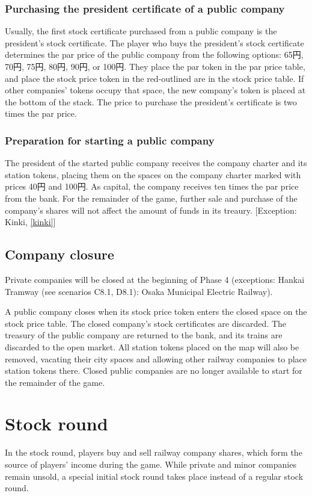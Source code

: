 \documentclass{article}
\begin{document}
\begin{CJK}{UTF8}{min}
\begin{multicols}{2}
\subsubsection{Purchasing the president certificate of a public company}
\label{floating-par-price}
Usually, the first stock certificate purchased from a public company
is the president's stock certificate. The player who buys the
president's stock certificate determines the par price of the public
company from the following options: 65円, 70円, 75円, 80円, 90円, or
100円. They place the par token in the par price table, and place
the stock price token in the red-outlined are in the stock price
table. If other companies' tokens occupy that space, the new company's
token is placed at the bottom of the stack. The price to purchase the
president's certificate is two times the par price.

\subsubsection{Preparation for starting a public company}
\label{floating-initial-capital}
The president of the started public company receives the company
charter and its station tokens, placing them on the spaces on the
company charter marked with prices 40円 and 100円. As capital,
the company receives ten times the par price from the bank. For the
remainder of the game, further sale and purchase of the company's
shares will not affect the amount of funds in its treaury. [Exception:
Kinki, \autoref{kinki}]

\subsection{Company closure}
Private companies will be closed at the beginning of Phase 4
(exceptions: Hankai Tramway (see scenarios C8.1, D8.1): Osaka Municipal Electric Railway).

A public company closes when its stock price token enters the closed
space on the stock price table. The closed company's stock
certificates are discarded. The treasury of the public company are
returned to the bank, and its trains are discarded to the open
market. All station tokens placed on the map will also be removed,
vacating their city spaces and allowing other railway companies to
place station tokens there. Closed public companies are no longer
available to start for the remainder of the game.


\section{Stock round}
In the stock round, players buy and sell railway company shares, which
form the source of players' income during the game. While private and
minor companies remain unsold, a special initial stock round takes
place instead of a regular stock round.


\end{multicols}
\end{CJK}
\end{document}
